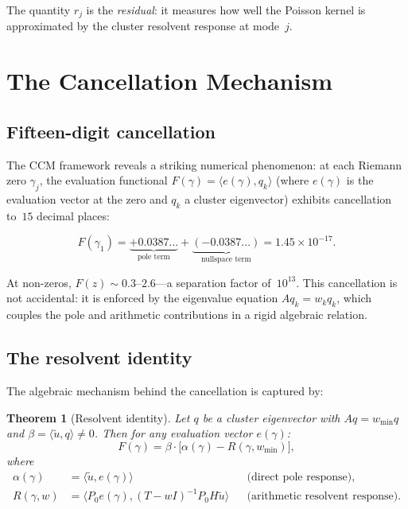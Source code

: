 \documentclass[12pt,a4paper]{article}
\newtheorem{theorem}{Theorem}[section]
\theoremstyle{definition}
\theoremstyle{remark}
\newcommand{\ip}[2]{\langle #1, #2 \rangle}
\newcommand{\utilde}{\tilde{u}}
\newcommand{\wmin}{w_{\min}}
\begin{document}
The quantity $r_j$ is the \emph{residual}: it measures how well the
Poisson kernel is approximated by the cluster resolvent response at
mode~$j$.

\section{The Cancellation Mechanism}
\label{sec:mechanism}

\subsection{Fifteen-digit cancellation}

The CCM framework reveals a striking numerical phenomenon:
at each Riemann zero $\gamma_j$, the evaluation functional $F(\gamma)
= \ip{e(\gamma)}{q_k}$ (where $e(\gamma)$ is the evaluation vector
at the zero and $q_k$ a cluster eigenvector) exhibits cancellation
to~$15$ decimal places:

\begin{equation}
\label{eq:cancel}
F(\gamma_1) = \underbrace{+0.0387\ldots}_{\text{pole term}}
+ \underbrace{(-0.0387\ldots)}_{\text{nullspace term}}
= 1.45 \times 10^{-17}.
\end{equation}

At non-zeros, $F(z) \sim 0.3$--$2.6$---a separation factor of~$10^{13}$.
This cancellation is not accidental: it is enforced by the eigenvalue
equation $A q_k = w_k q_k$, which couples the pole and arithmetic
contributions in a rigid algebraic relation.

\subsection{The resolvent identity}

The algebraic mechanism behind the cancellation is captured by:

\begin{theorem}[Resolvent identity]
\label{thm:resolvent}
Let $q$ be a cluster eigenvector with $A q = \wmin q$ and $\beta = \ip{\utilde}{q} \neq 0$.
Then for any evaluation vector $e(\gamma)$:
\begin{equation}
\label{eq:resolvent}
F(\gamma) = \beta \cdot \bigl[\alpha(\gamma) - R(\gamma, \wmin)\bigr],
\end{equation}
where
\begin{align}
\alpha(\gamma) &= \ip{\utilde}{e(\gamma)}
  && \text{(direct pole response)}, \\
R(\gamma, w) &= \ip{P_0 e(\gamma)}{(T - w I)^{-1} P_0 H \utilde}
  && \text{(arithmetic resolvent response)}.
\end{align}
\end{theorem}
\end{document}
